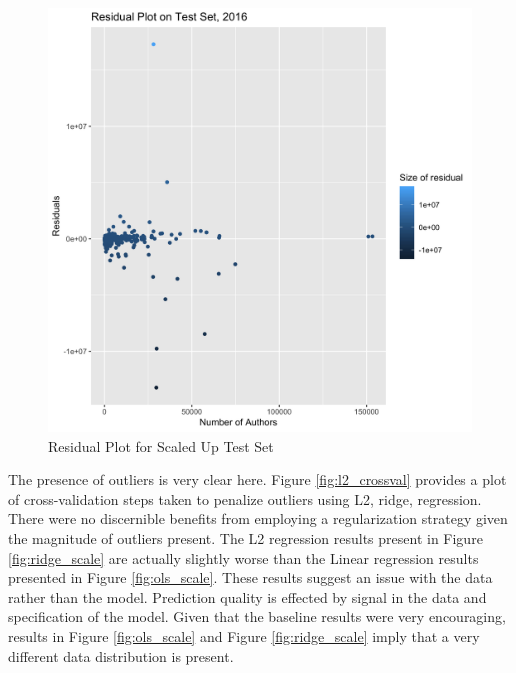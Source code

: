 \documentclass{article}
\begin{document}
\begin{figure}[h]
  \centering
  \includegraphics[scale=0.1]{f4}
  \caption{Residual Plot for Scaled Up Test Set}
  \label{fig:ols_residuals}
\end{figure}

The presence of outliers is very clear here. Figure \ref{fig:l2_crossval}
provides a plot of cross-validation steps taken to penalize outliers using
L2, ridge, regression. There were no discernible benefits from employing a
regularization strategy given the magnitude of outliers present. The L2
regression results present in Figure \ref{fig:ridge_scale} are actually
slightly worse than the Linear regression results presented in Figure
\ref{fig:ols_scale}. These results suggest an issue with the data rather
than the model. Prediction quality is effected by signal in the data and
specification of the model. Given that the baseline results were very
encouraging, results in Figure \ref{fig:ols_scale} and Figure
\ref{fig:ridge_scale} imply that a very different data distribution is
present.
\end{document}
